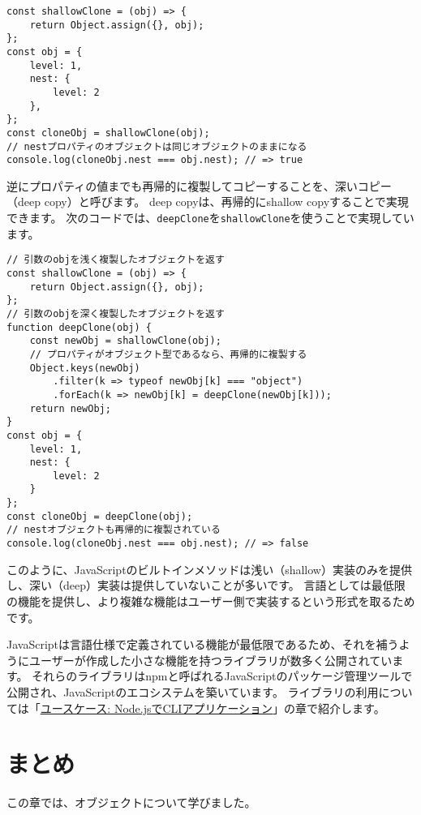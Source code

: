 \begin{lstlisting}
const shallowClone = (obj) => {
    return Object.assign({}, obj);
};
const obj = {
    level: 1,
    nest: {
        level: 2
    },
};
const cloneObj = shallowClone(obj);
// nestプロパティのオブジェクトは同じオブジェクトのままになる
console.log(cloneObj.nest === obj.nest); // => true
\end{lstlisting}

逆にプロパティの値までも再帰的に複製してコピーすることを、深いコピー（deep
copy）と呼びます。 deep copyは、再帰的にshallow
copyすることで実現できます。
次のコードでは、\texttt{deepClone}を\texttt{shallowClone}を使うことで実現しています。

\begin{lstlisting}
// 引数のobjを浅く複製したオブジェクトを返す
const shallowClone = (obj) => {
    return Object.assign({}, obj);
};
// 引数のobjを深く複製したオブジェクトを返す
function deepClone(obj) {
    const newObj = shallowClone(obj);
    // プロパティがオブジェクト型であるなら、再帰的に複製する
    Object.keys(newObj)
        .filter(k => typeof newObj[k] === "object")
        .forEach(k => newObj[k] = deepClone(newObj[k]));
    return newObj;
}
const obj = {
    level: 1,
    nest: {
        level: 2
    }
};
const cloneObj = deepClone(obj);
// nestオブジェクトも再帰的に複製されている
console.log(cloneObj.nest === obj.nest); // => false
\end{lstlisting}

このように、JavaScriptのビルトインメソッドは浅い（shallow）実装のみを提供し、深い（deep）実装は提供していないことが多いです。
言語としては最低限の機能を提供し、より複雑な機能はユーザー側で実装するという形式を取るためです。

JavaScriptは言語仕様で定義されている機能が最低限であるため、それを補うようにユーザーが作成した小さな機能を持つライブラリが数多く公開されています。
それらのライブラリはnpmと呼ばれるJavaScriptのパッケージ管理ツールで公開され、JavaScriptのエコシステムを築いています。
ライブラリの利用については「\hyperlink{node-cli}{ユースケース:
Node.jsでCLIアプリケーション}」の章で紹介します。
\newpage
\hypertarget{conclusion}{%
\section{まとめ}\label{conclusion}}

この章では、オブジェクトについて学びました。

